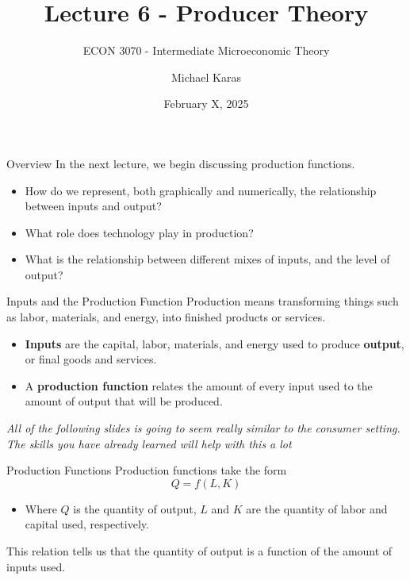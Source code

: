 \documentclass[11pt,t]{beamer}
\author{Michael Karas}
\title{Lecture 6  - Producer Theory}
\subtitle{ECON 3070 - Intermediate Microeconomic Theory}
\date{February X, 2025}
\begin{document}
\begin{frame}
  \titlepage
\end{frame}

\begin{frame}{Overview}
  In the next lecture, we begin discussing production functions.
  
  \bigskip
  \begin{itemize}
    \item How do we represent, both graphically and numerically, the relationship between inputs and output?

    \item What role does technology play in production?

    \item What is the relationship between different mixes of inputs, and the level of output?
  \end{itemize}
\end{frame}

\begin{frame}{Inputs and the Production Function}
  Production means transforming things such as labor, materials, and energy, into finished products or services.
  
  \bigskip
  \begin{itemize}
    \item \textbf{Inputs} are the capital, labor, materials, and energy used to produce \textbf{output}, or final goods and services.

    \item A \textbf{production function} relates the amount of every input used to the amount of output that will be produced.
  \end{itemize}

  \pause\bigskip
  \begin{center}
    \emph{All of the following slides is going to seem really similar to the consumer setting. The skills you have already learned will help with this a lot}
  \end{center}
\end{frame}

\begin{frame}{Production Functions}
  Production functions take the form
  \begin{equation*}
    Q=f(L,K)
  \end{equation*}
  
  \bigskip
  \begin{itemize}
    \item Where $Q$ is the quantity of output, $L$ and $K$ are the quantity of labor and capital used, respectively.

  \end{itemize}
  
  \bigskip
  This relation tells us that the quantity of output is a function of the amount of inputs used.
\end{frame}
\end{document}
